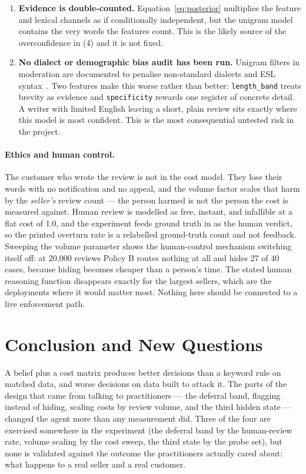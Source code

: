 \documentclass{article}
\begin{document}
\begin{enumerate}
    \item \textbf{Evidence is double-counted.} Equation~\eqref{eq:posterior}
          multiplies the feature and lexical channels as if conditionally
          independent, but the unigram model contains the very words the
          features count. This is the likely source of the overconfidence in
          (4) and it is not fixed.
    \item \textbf{No dialect or demographic bias audit has been run.} Unigram
          filters in moderation are documented to penalise non-standard
          dialects and ESL syntax~\cite{sap2019risk}. Two features make this
          worse rather than better: \texttt{length\_band} treats brevity as
          evidence and \texttt{specificity} rewards one register of concrete
          detail. A writer with limited English leaving a short, plain review
          sits exactly where this model is most confident. This is the most
          consequential untested risk in the project.
\end{enumerate}

\paragraph{Ethics and human control.} The customer who wrote the review is not
in the cost model. They lose their words with no notification and no appeal,
and the volume factor scales that harm by the \emph{seller's} review count ---
the person harmed is not the person the cost is measured against. Human review
is modelled as free, instant, and infallible at a flat cost of 1.0, and the
experiment feeds ground truth in as the human verdict, so the printed overturn
rate is a relabelled ground-truth count and not feedback. Sweeping the volume
parameter shows the human-control mechanism switching itself off: at 20{,}000
reviews Policy B routes nothing at all and hides 27 of 40 cases, because hiding
becomes cheaper than a person's time. The stated human reasoning function
disappears exactly for the largest sellers, which are the deployments where it
would matter most. Nothing here should be connected to a live enforcement path.

\section{Conclusion and New Questions}

A belief plus a cost matrix produces better decisions than a keyword rule on
matched data, and worse decisions on data built to attack it. The parts of the
design that came from talking to practitioners --- the deferral band, flagging
instead of hiding, scaling costs by review volume, and the third hidden state
--- changed the agent more than any measurement did. Three of the four are
exercised somewhere in the experiment (the deferral band by the human-review
rate, volume scaling by the cost sweep, the third state by the probe set), but
none is validated against the outcome the practitioners actually cared about:
what happens to a real seller and a real customer.
\end{document}
